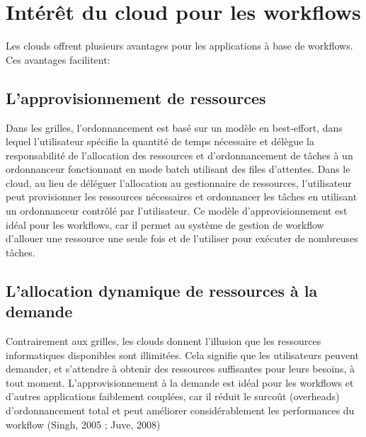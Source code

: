 % 
 

\section{ Intérêt du cloud pour les workflows }
Les clouds offrent plusieurs avantages pour les applications à base de workflows. 
Ces avantages facilitent: 
\subsection{L’approvisionnement de ressources }
Dans les grilles, l'ordonnancement est basé sur un modèle en best-effort, dans lequel l’utilisateur spécifie la quantité de temps nécessaire et délègue la responsabilité de l'allocation des ressources et d'ordonnancement de tâches à un ordonnanceur fonctionnant en mode batch utilisant des files d’attentes. Dans le cloud, au lieu de déléguer l’allocation au gestionnaire de ressources, l'utilisateur peut provisionner les ressources nécessaires et ordonnancer les tâches en utilisant un ordonnanceur contrôlé par l'utilisateur. Ce modèle d’approvisionnement est idéal pour les workflows, car il permet au système de gestion de workflow d'allouer une ressource une seule fois et de l'utiliser pour exécuter de nombreuses tâches. 
\subsection{L’allocation dynamique de ressources à la demande }
Contrairement aux grilles, les clouds donnent l'illusion que les ressources informatiques disponibles sont illimitées. Cela signifie que les utilisateurs peuvent demander, et s’attendre à obtenir des ressources suffisantes pour leurs besoins, à tout moment. L’approvisionnement à la demande est idéal pour les workflows et d'autres applications faiblement couplées, car il réduit le surcoût (overheads) d’ordonnancement total et peut améliorer considérablement les performances du workflow (Singh, 2005 ; Juve, 2008) 
